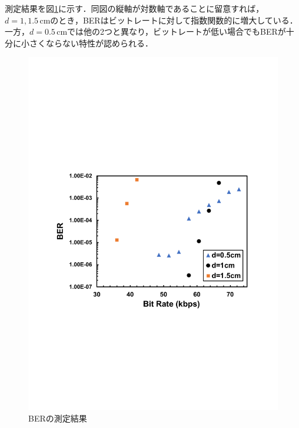 測定結果を図\ref{bergraph}に示す．同図の縦軸が対数軸であることに留意すれば，$d=1,1.5\, \mathrm{cm}$のとき，BERはビットレートに対して指数関数的に増大している．一方，$d=0.5\, \mathrm{cm}$では他の2つと異なり，ビットレートが低い場合でもBERが十分に小さくならない特性が認められる．

\begin{figure}[h]
\begin{center}

\includegraphics[width=120mm]{figures/bergraph.pdf}
  \caption{BERの測定結果}
  \label{bergraph}

  \end{center}
\end{figure}

